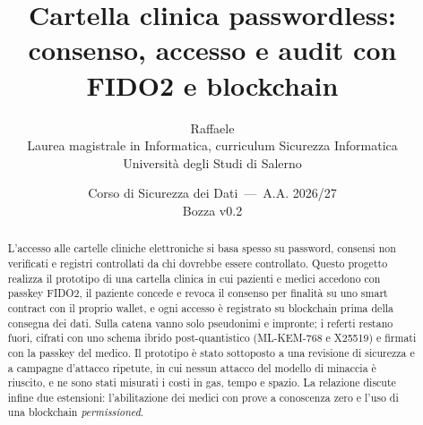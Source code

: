 \documentclass[11pt,a4paper]{article}
\title{Cartella clinica passwordless:\\ consenso, accesso e audit con FIDO2 e blockchain}
\author{Raffaele \\ \small Laurea magistrale in Informatica, curriculum Sicurezza Informatica \\ \small Università degli Studi di Salerno}
\date{Corso di Sicurezza dei Dati \,---\, A.A. 2026/27 \\ \small Bozza v0.2}
\begin{document}
\maketitle
\begin{abstract}
L'accesso alle cartelle cliniche elettroniche si basa spesso su password, consensi non verificati e registri controllati da chi dovrebbe essere controllato. Questo progetto realizza il prototipo di una cartella clinica in cui pazienti e medici accedono con passkey FIDO2, il paziente concede e revoca il consenso per finalità su uno smart contract con il proprio wallet, e ogni accesso è registrato su blockchain prima della consegna dei dati. Sulla catena vanno solo pseudonimi e impronte; i referti restano fuori, cifrati con uno schema ibrido post-quantistico (ML-KEM-768 e X25519) e firmati con la passkey del medico. Il prototipo è stato sottoposto a una revisione di sicurezza e a campagne d'attacco ripetute, in cui nessun attacco del modello di minaccia è riuscito, e ne sono stati misurati i costi in gas, tempo e spazio. La relazione discute infine due estensioni: l'abilitazione dei medici con prove a conoscenza zero e l'uso di una blockchain \emph{permissioned}.
\end{abstract}
\newpage
\tableofcontents
\newpage














\appendix


\printbibliography
\end{document}

